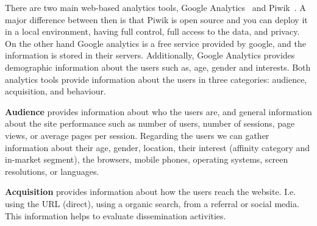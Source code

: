 \documentclass{article}
\begin{document}
   
   
There are two main web-based analytics tools, Google Analytics~\cite{} and Piwik~\cite{}. A major difference between then is that Piwik is open source and you can deploy it in a local environment, having full control, full access to the data, and privacy. On the other hand Google analytics is a free service provided by google, and the information is stored in their servers. Additionally, Google Analytics provides demographic information about the users such as, age, gender and interests. Both analytics tools provide information about the users in three categories: audience, acquisition, and behaviour.

\textbf{Audience} provides information about who the users are, and general information about the site performance such as number of users, number of sessions, page views, or average pages per session. Regarding the users we can gather information about their age, gender, location, their interest (affinity category and in-market segment), the browsers, mobile phones, operating systems, screen resolutions, or languages. 
   
\textbf{Acquisition} provides information about how the users reach the website. I.e. using the URL (direct), using a organic search, from a referral or social media. This information helps to evaluate dissemination activities.   
\end{document}
